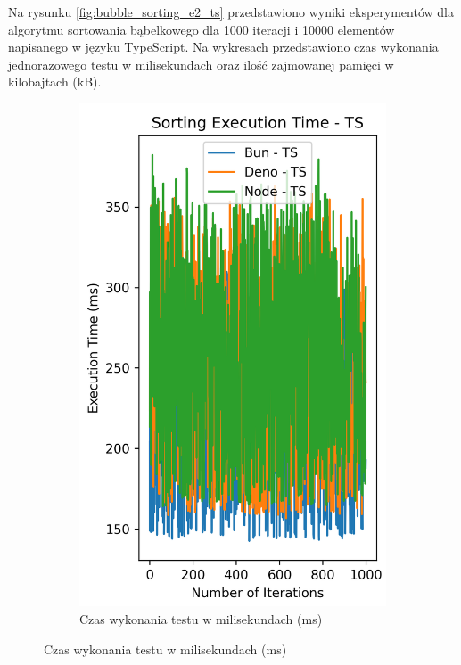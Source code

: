 Na rysunku \ref{fig:bubble_sorting_e2_ts} przedstawiono wyniki eksperymentów dla algorytmu sortowania bąbelkowego dla 1000 iteracji i 10000 elementów napisanego w języku TypeScript. Na wykresach przedstawiono czas wykonania jednorazowego testu w milisekundach oraz ilość zajmowanej pamięci w kilobajtach (kB).

\begin{figure}[H]
  \centering
  \begin{subfigure}[b]{0.44\textwidth}
    \centering
    \includegraphics[width=\textwidth]{Figures/sorting/sorting_bubble_1000_10000_ts_time.png}
    \caption{Czas wykonania testu w milisekundach (ms)}

\end{subfigure}
\end{figure}
